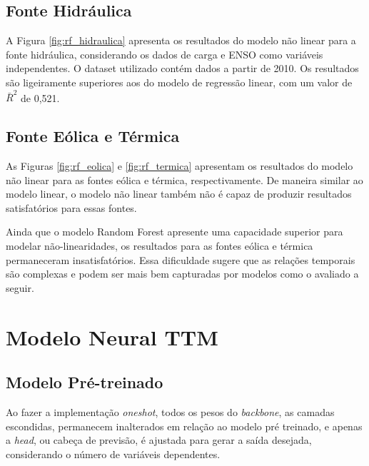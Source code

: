 \subsection{Fonte Hidráulica}
\begin{figure}[!ht]
  {}
  {}
\end{figure}
A Figura \ref{fig:rf_hidraulica} apresenta os resultados do modelo não linear para a fonte hidráulica, considerando os dados 
de carga e ENSO como variáveis independentes. O dataset utilizado contém dados a partir de 2010. Os resultados são
ligeiramente superiores aos do modelo de regressão linear, com um valor de $\bar{R}^2$ de 0,521.

\subsection{Fonte Eólica e Térmica}
\begin{figure}[!ht]
  {}
  {}
\end{figure}
\begin{figure}[!ht]
  {}
  {}
\end{figure}

As Figuras \ref{fig:rf_eolica} e \ref{fig:rf_termica} apresentam os resultados do modelo não linear para as fontes eólica 
e térmica, respectivamente. De maneira similar ao modelo linear, o modelo não linear também não é capaz de produzir resultados
satisfatórios para essas fontes.

Ainda que o modelo Random Forest apresente uma capacidade superior para modelar não-linearidades, os resultados para as 
fontes eólica e térmica permaneceram insatisfatórios. Essa dificuldade sugere que as relações temporais são complexas e 
podem ser mais bem capturadas por modelos como o avaliado a seguir.

\section{Modelo Neural TTM}
\subsection{Modelo Pré-treinado}
Ao fazer a implementação \textit{oneshot}, todos os pesos do \textit{backbone}, as camadas escondidas, permanecem inalterados
em relação ao modelo pré treinado, e apenas a \textit{head}, ou cabeça de previsão, é ajustada para gerar a saída desejada,
considerando o número de variáveis dependentes.

